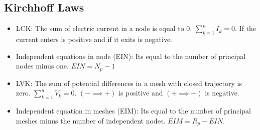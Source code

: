 \documentclass[letterpaper]{article}
\newcommand{\divline}{\noindent\makebox[\linewidth]{\rule{\textwidth}{0.4pt}}}
\begin{document}
    \begin{multicols}{2}
        \section{Kirchhoff Laws}

        \begin{itemize}
            \item LCK: The sum of electric current in a node is equal to 0. \(\sum_{k=1}^{n} I_{k} = 0\). If the current enters is positive and if it exits is negative.
            \item Independent equations in  node (EIN):  Its equal to the number of principal nodes minus one. \(EIN = N_{p} - 1\)
            \item LVK: The sum of potential differences in a mesh with closed trajectory is zero. \(\sum_{k=1}^{n} V_{k} = 0\). \((- \implies +)\) is positive and \((+ \implies -)\) is negative.
            \item Independent equation in meshes (EIM): Its equal to the number of principal meshes minus the number of independent nodes. \(EIM = R_{p} - EIN\).
        \end{itemize}
    \end{multicols}
    \divline
\end{document}
